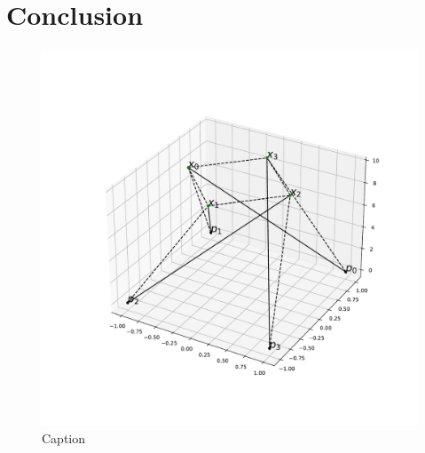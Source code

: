 \section{Conclusion}

\begin{figure}
    \centering
    \includegraphics[width=\textwidth]{Bilder/oppg1.pdf}
    \caption[Caption used in list of tables]{Caption}
    \label{fig:test}
\end{figure}
